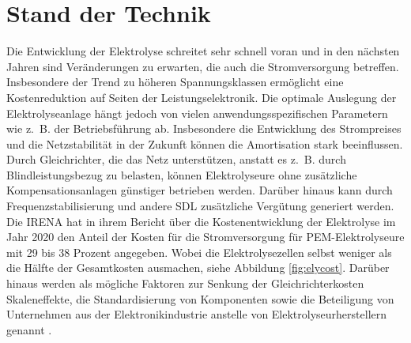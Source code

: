 \section{Stand der Technik}
Die Entwicklung der Elektrolyse schreitet sehr schnell voran und in den nächsten Jahren sind Veränderungen zu erwarten, die auch die Stromversorgung betreffen. Insbesondere der Trend zu höheren Spannungsklassen ermöglicht eine Kostenreduktion auf Seiten der Leistungselektronik. Die optimale Auslegung der Elektrolyseanlage hängt jedoch von vielen anwendungsspezifischen Parametern wie z.~B. der Betriebsführung ab. Insbesondere die Entwicklung des Strompreises und die Netzstabilität in der Zukunft können die Amortisation stark beeinflussen. Durch Gleichrichter, die das Netz unterstützen, anstatt es z.~B. durch Blindleistungsbezug zu belasten, können Elektrolyseure ohne zusätzliche Kompensationsanlagen günstiger betrieben werden. Darüber hinaus kann durch Frequenzstabilisierung und andere \gls{SDL} zusätzliche Vergütung generiert werden. \\
Die \gls{IRENA} hat in ihrem Bericht über die Kostenentwicklung der Elektrolyse im Jahr 2020 den Anteil der Kosten für die Stromversorgung für \gls{PEM}-Elektrolyseure mit 29 bis 38 Prozent angegeben. Wobei die Elektrolysezellen selbst weniger als die Hälfte der Gesamtkosten ausmachen, siehe Abbildung \ref{fig:elycost}. Darüber hinaus werden als mögliche Faktoren zur Senkung der Gleichrichterkosten Skaleneffekte, die Standardisierung von Komponenten sowie die Beteiligung von Unternehmen aus der Elektronikindustrie anstelle von Elektrolyseurherstellern genannt \cite{IRENA2020}. 
